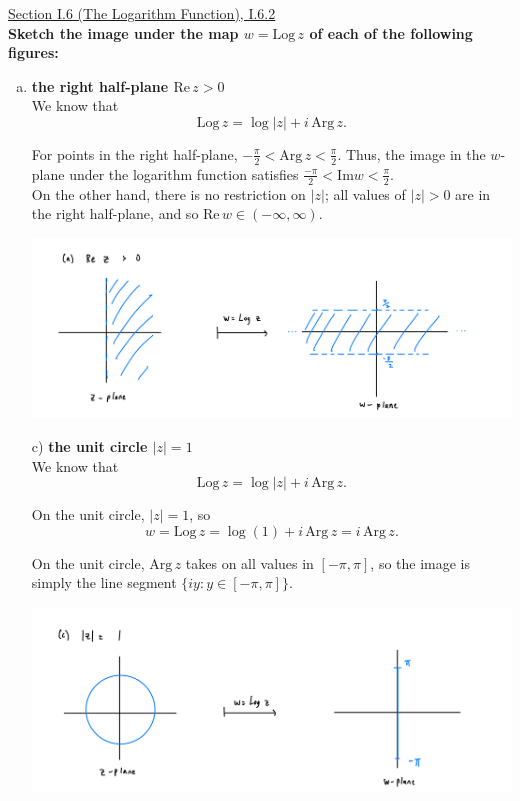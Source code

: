 \documentclass[11pt]{article}
\theoremstyle{definition}
\begin{document}
\newpage

\underline{Section I.6 (The Logarithm Function), I.6.2} \\

\textbf{Sketch the image under the map $w = \mathrm{Log} \, z$ of each of the following figures:}

\begin{enumerate}[a)]
\item \textbf{the right half-plane $\mathrm{Re} \, z > 0$} \\

We know that \[\mathrm{Log} \, z = \log |z| + i \, \mathrm{Arg} \, z.\]

For points in the right half-plane, $-\frac{\pi}{2} < \mathrm{Arg} \, z < \frac{\pi}{2}$. Thus, the image in the $w$-plane under the logarithm function satisfies $\frac{-\pi}{2} < \mathrm{Im} w < \frac{\pi}{2}.$ \\

On the other hand, there is no restriction on $|z|$; all values of $|z| > 0$ are in the right half-plane, and so $\mathrm{Re} \, w \in (-\infty, \infty)$. 

\begin{center}
\includegraphics*[scale = 0.15]{I.6.2a.jpeg}
\end{center}

\item[c)] \textbf{the unit circle $|z| = 1$} \\

We know that \[\mathrm{Log} \, z = \log |z| + i \, \mathrm{Arg} \, z.\]

On the unit circle, $|z| = 1$, so 
\[ w = \mathrm{Log} \, z = \log (1) + i \, \mathrm{Arg} \, z = i \, \mathrm{Arg} \, z.\]

On the unit circle, $\mathrm{Arg} \, z$ takes on all values in $[-\pi, \pi]$, so the image is simply the line segment $\{i y : y \in [-\pi, \pi]\}.$ 


\begin{center}
  \includegraphics*[scale = 0.15]{I.6.2c.jpeg}
\end{center}



\end{enumerate}
\end{document}
